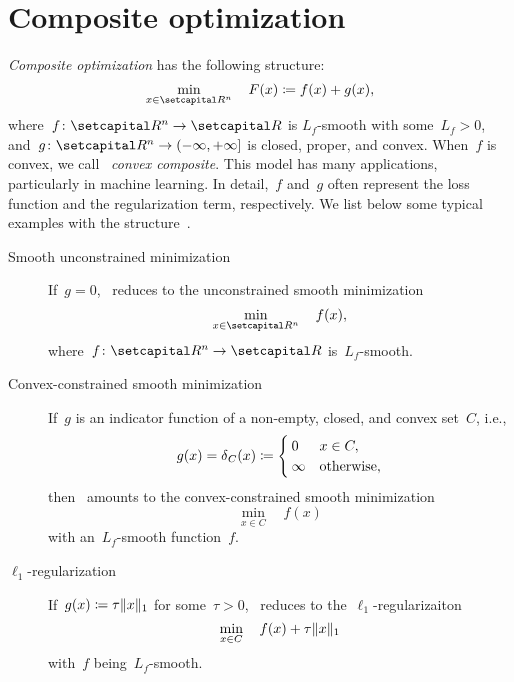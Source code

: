 \documentclass[../../main]{subfiles}
\begin{document}
\section{Composite optimization} 
\emph{Composite optimization} has the following structure:
\begin{equation} \label{eq:composite}
    \min_{x \in \setR^n} \quad F(x) \coloneqq f(x) + g(x)
    ,\end{equation}
where~$f \colon \setR^n \to \setR$ is $L_f$-smooth with some~$L_f > 0$, and~$g \colon \setR^n \to (-\infty, +\infty]$ is closed, proper, and convex.
When~$f$ is convex, we call~ \emph{convex composite}.
This model has many applications, particularly in machine learning.
In detail,~$f$ and~$g$ often represent the loss function and the regularization term, respectively.
We list below some typical examples with the structure~.

\begin{example} 
    \begin{description}
        \item[Smooth unconstrained minimization] If~$g = 0$,~ reduces to the unconstrained smooth minimization
            \begin{equation}
                \min_{x \in \setR^n} \quad f(x)
                ,\end{equation}
            where~$f \colon \setR^n \to \setR$ is~$L_f$-smooth.
        \item[Convex-constrained smooth minimization] If~$g$ is an indicator function of a non-empty, closed, and convex set~$C$, i.e.,
            \begin{equation} \label{eq:indicator}
                g(x) = \operatorname{\delta}_C(x) \coloneqq
                \begin{cases}
                    0      & x \in C,    \\
                    \infty & \text{otherwise},
                \end{cases}
            \end{equation}
            then~ amounts to the convex-constrained smooth minimization
            \begin{equation}
                \min_{x \in C} \quad f(x)
            \end{equation}
            with an~$L_f$-smooth function~$f$.
        \item[$\ell_1$-regularization] If~$g(x) \coloneqq \tau \lVert x\rVert_1$ for some~$\tau > 0$,~ reduces to the~$\ell_1$-regularizaiton
            \begin{equation}
                \min_{x \in C} \quad f(x) + \tau \lVert x\rVert_1
            \end{equation}
            with~$f$ being~$L_f$-smooth.
    \end{description}
\end{example}




\end{document}
